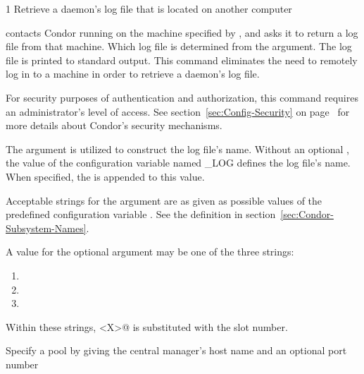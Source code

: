\begin{ManPage}{\label{man-condor-fetchlog}}{1}
{Retrieve a daemon's log file that is located on another computer}

\Synopsis 
{}
\ToolArgsBase



\Description 

 contacts Condor running on the machine specified by
, and asks it to return a log file from that
machine.  Which log file is determined from
the  argument.
The log file is printed to standard output.
This command eliminates the need to remotely log in to a
machine in order to retrieve a daemon's log file.

For security purposes of authentication and authorization, 
this command requires an administrator's level of access.
See section~\ref{sec:Config-Security} 
on page~\pageref{sec:Config-Security} for more details about Condor's
security mechanisms.

The  argument is utilized to construct
the log file's name.
Without an optional ,
the value of the configuration variable named \_LOG 
defines the log file's name.
When specified, the  is appended to this value.

Acceptable strings for the argument  are as given as
possible values of the predefined configuration
variable .
See the definition in
section~\ref{sec:Condor-Subsystem-Names}.

A value for the optional  argument may be one of
the three strings:
\begin{enumerate}
\item{}
\item{}
\item{}
\end{enumerate}
Within these strings, \verb@<X>@ is substituted with the slot number.
 
\begin{Options}
    \ToolArgsBaseDesc
    {Specify a pool by giving the central manager's host name
    and an optional port number}
\end{Options}


\end{ManPage}
